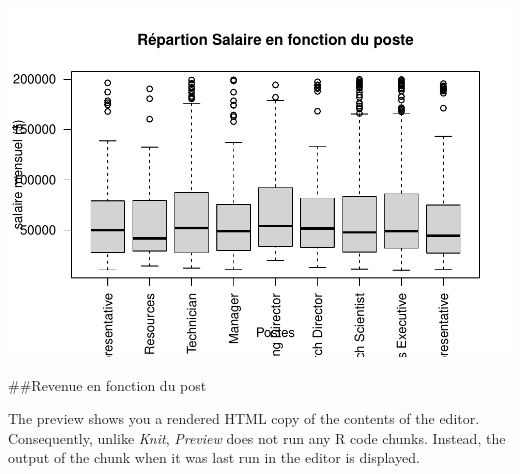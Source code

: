 \documentclass[
]{article}
\newenvironment{Shaded}{\begin{snugshade}}{\end{snugshade}}
\newcommand{\AttributeTok}[1]{\textcolor[rgb]{0.77,0.63,0.00}{#1}}
\newcommand{\CommentTok}[1]{\textcolor[rgb]{0.56,0.35,0.01}{\textit{#1}}}
\newcommand{\DecValTok}[1]{\textcolor[rgb]{0.00,0.00,0.81}{#1}}
\newcommand{\FunctionTok}[1]{\textcolor[rgb]{0.00,0.00,0.00}{#1}}
\newcommand{\NormalTok}[1]{#1}
\newcommand{\SpecialCharTok}[1]{\textcolor[rgb]{0.00,0.00,0.00}{#1}}
\newcommand{\StringTok}[1]{\textcolor[rgb]{0.31,0.60,0.02}{#1}}
\begin{document}
\begin{Shaded}
\end{Shaded}

\includegraphics{Projet_files/figure-latex/unnamed-chunk-10-3.pdf}

\#\#Revenue en fonction du post

The preview shows you a rendered HTML copy of the contents of the
editor. Consequently, unlike \emph{Knit}, \emph{Preview} does not run
any R code chunks. Instead, the output of the chunk when it was last run
in the editor is displayed.
\end{document}
